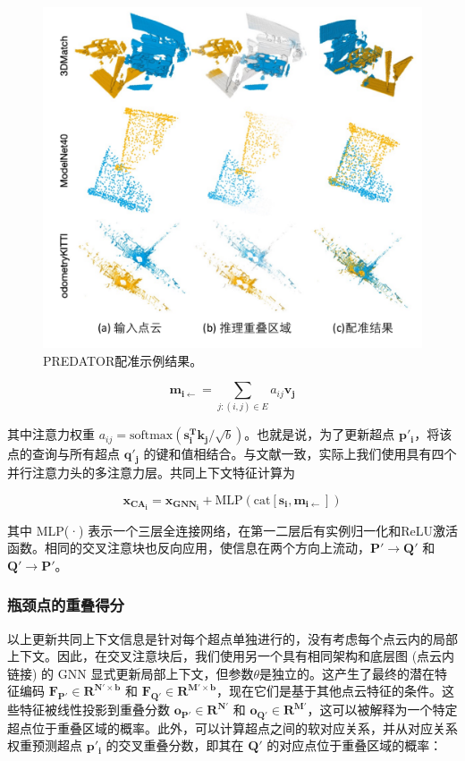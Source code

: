 \begin{figure}
    \vspace{-5mm}
    \centering
    \includegraphics[width=0.6\linewidth]{images/PREDATOR_results.pdf}
    \caption{
        PREDATOR配准示例结果。}
    \label{fig:predator_results}
    \vspace{-5mm}
\end{figure}

\begin{equation}
\boldsymbol{m_{i \leftarrow}} = \sum_{j:(i,j)\in E} a_{ij}\boldsymbol{v_j}
\end{equation}

其中注意力权重 $a_{ij} = \text{softmax}(\boldsymbol{s_i^T k_j}/\sqrt{b})$。也就是说，为了更新超点 $\boldsymbol{p'_i}$，将该点的查询与所有超点 $\boldsymbol{q'_j}$ 的键和值相结合。与文献一致，实际上我们使用具有四个并行注意力头的多注意力层。共同上下文特征计算为

\begin{equation}
\boldsymbol{x_{CA_i}} = \boldsymbol{x_{GNN_i}} + \text{MLP}(\text{cat}[\boldsymbol{s_i}, \boldsymbol{m_{i \leftarrow}}])
\end{equation}

其中 MLP(·) 表示一个三层全连接网络，在第一二层后有实例归一化和ReLU激活函数。相同的交叉注意块也反向应用，使信息在两个方向上流动，$\boldsymbol{P'} \rightarrow \boldsymbol{Q'}$ 和 $\boldsymbol{Q'} \rightarrow \boldsymbol{P'}$。

\subsubsection{瓶颈点的重叠得分}
以上更新共同上下文信息是针对每个超点单独进行的，没有考虑每个点云内的局部上下文。因此，在交叉注意块后，我们使用另一个具有相同架构和底层图 (点云内链接) 的 GNN 显式更新局部上下文，但参数$\theta$是独立的。这产生了最终的潜在特征编码 $\boldsymbol{F_{P'} \in R^{N' \times b}}$ 和 $\boldsymbol{F_{Q'} \in R^{M' \times b}}$，现在它们是基于其他点云特征的条件。这些特征被线性投影到重叠分数 $\boldsymbol{o_{P'} \in R^{N'}}$ 和 $\boldsymbol{o_{Q'} \in R^{M'}}$，这可以被解释为一个特定超点位于重叠区域的概率。此外，可以计算超点之间的软对应关系，并从对应关系权重预测超点 $\boldsymbol{p'_i}$ 的交叉重叠分数，即其在 $\boldsymbol{Q'}$ 的对应点位于重叠区域的概率：

